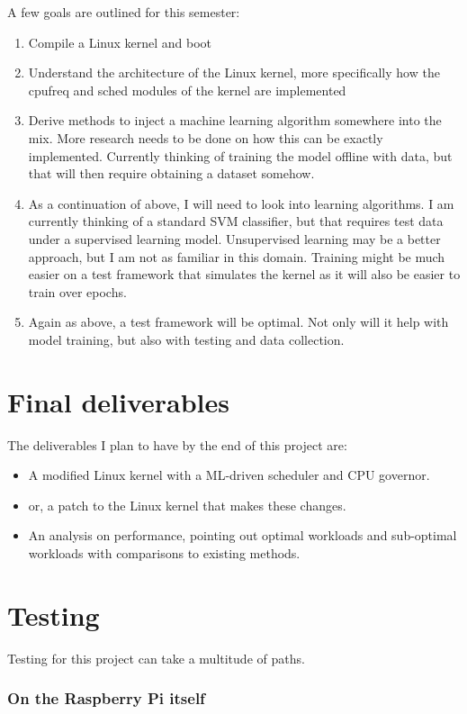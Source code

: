 \documentclass[12pt]{article}
\def\ind{\hspace*{0.3in}}
\begin{document}
A few goals are outlined for this semester:
\begin{enumerate}
    \item Compile a Linux kernel and boot
    \item Understand the architecture of the Linux kernel, more specifically how the cpufreq and sched modules of the kernel are implemented
    \item Derive methods to inject a machine learning algorithm somewhere into the mix. More research needs to be done on how this can be exactly implemented. Currently thinking of training the model offline with data, but that will then require obtaining a dataset somehow.
    \item As a continuation of above, I will need to look into learning algorithms. I am currently thinking of a standard SVM classifier, but that requires test data under a supervised learning model. Unsupervised learning may be a better approach, but I am not as familiar in this domain. Training might be much easier on a test framework that simulates the kernel as it will also be easier to train over epochs.
    \item Again as above, a test framework will be optimal. Not only will it help with model training, but also with testing and data collection.
\end{enumerate}
\section*{Final deliverables}
The deliverables I plan to have by the end of this project are:

\begin{itemize}
    \item A modified Linux kernel with a ML-driven scheduler and CPU governor.
    \item or, a patch to the Linux kernel that makes these changes.
    \item An analysis on performance, pointing out optimal workloads and sub-optimal workloads with comparisons to existing methods.
\end{itemize}

\section*{Testing}

\ind Testing for this project can take a multitude of paths. 

\subsubsection*{On the Raspberry Pi itself}
\end{document}

